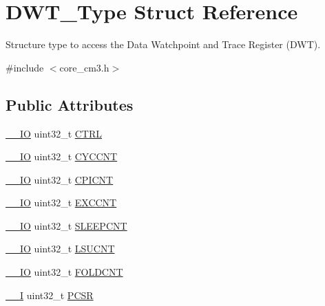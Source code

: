 \hypertarget{structDWT__Type}{}\section{D\+W\+T\+\_\+\+Type Struct Reference}
\label{structDWT__Type}


Structure type to access the Data Watchpoint and Trace Register (D\+WT).  




{\ttfamily \#include $<$core\+\_\+cm3.\+h$>$}

\subsection*{Public Attributes}
\begin{DoxyCompactItemize}
\item 
\hyperlink{core__sc300_8h_aec43007d9998a0a0e01faede4133d6be}{\+\_\+\+\_\+\+IO} uint32\+\_\+t \hyperlink{structDWT__Type_a37964d64a58551b69ce4c8097210d37d}{C\+T\+RL}
\item 
\hyperlink{core__sc300_8h_aec43007d9998a0a0e01faede4133d6be}{\+\_\+\+\_\+\+IO} uint32\+\_\+t \hyperlink{structDWT__Type_a71680298e85e96e57002f87e7ab78fd4}{C\+Y\+C\+C\+NT}
\item 
\hyperlink{core__sc300_8h_aec43007d9998a0a0e01faede4133d6be}{\+\_\+\+\_\+\+IO} uint32\+\_\+t \hyperlink{structDWT__Type_a88cca2ab8eb1b5b507817656ceed89fc}{C\+P\+I\+C\+NT}
\item 
\hyperlink{core__sc300_8h_aec43007d9998a0a0e01faede4133d6be}{\+\_\+\+\_\+\+IO} uint32\+\_\+t \hyperlink{structDWT__Type_ac0801a2328f3431e4706fed91c828f82}{E\+X\+C\+C\+NT}
\item 
\hyperlink{core__sc300_8h_aec43007d9998a0a0e01faede4133d6be}{\+\_\+\+\_\+\+IO} uint32\+\_\+t \hyperlink{structDWT__Type_a8afd5a4bf994011748bc012fa442c74d}{S\+L\+E\+E\+P\+C\+NT}
\item 
\hyperlink{core__sc300_8h_aec43007d9998a0a0e01faede4133d6be}{\+\_\+\+\_\+\+IO} uint32\+\_\+t \hyperlink{structDWT__Type_aeba92e6c7fd3de4ba06bfd94f47f5b35}{L\+S\+U\+C\+NT}
\item 
\hyperlink{core__sc300_8h_aec43007d9998a0a0e01faede4133d6be}{\+\_\+\+\_\+\+IO} uint32\+\_\+t \hyperlink{structDWT__Type_a35f2315f870a574e3e6958face6584ab}{F\+O\+L\+D\+C\+NT}
\item 
\hyperlink{core__sc300_8h_af63697ed9952cc71e1225efe205f6cd3}{\+\_\+\+\_\+I} uint32\+\_\+t \hyperlink{structDWT__Type_abc5ae11d98da0ad5531a5e979a3c2ab5}{P\+C\+SR}
\item 

\end{DoxyCompactItemize}
